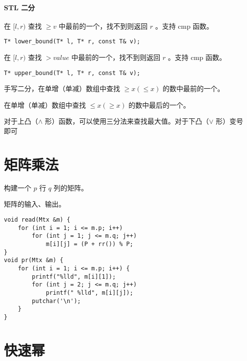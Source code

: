 \documentclass{probook}
\begin{document}
\begin{multicols}{2}
\paragraph*{STL 二分}

在 $[l,r)$ 查找 $\geqslant v$ 中最前的一个，找不到则返回 $r$ 。支持 cmp 函数。

\begin{lstlisting}[style=cpp]
T* lower_bound(T* l, T* r, const T& v);
\end{lstlisting}

在 $[l,r)$ 查找 $> value$ 中最前的一个，找不到则返回 $r$ 。支持 cmp 函数。

\begin{lstlisting}[style=cpp]
T* upper_bound(T* l, T* r, const T& v);
\end{lstlisting}

手写二分，在单增（单减）数组中查找 $\geqslant x(\leqslant x)$ 的数中最前的一个。



在单增（单减）数组中查找 $\leqslant x(\geqslant x)$ 的数中最后的一个。



对于上凸（$\wedge$ 形）函数，可以使用三分法来查找最大值。对于下凸（$\vee$ 形）变号即可



\section{矩阵乘法}

构建一个 $p$ 行 $q$ 列的矩阵。



矩阵的输入、输出。

\begin{lstlisting}[style=cpp]
void read(Mtx &m) {
    for (int i = 1; i <= m.p; i++)
        for (int j = 1; j <= m.q; j++)
            m[i][j] = (P + rr()) % P;
}
void pr(Mtx &m) {
    for (int i = 1; i <= m.p; i++) {
        printf("%lld", m[i][1]);
        for (int j = 2; j <= m.q; j++)
            printf(" %lld", m[i][j]);
        putchar('\n');
    }
}
\end{lstlisting}

\section{快速幂}


\end{multicols}
\end{document}
